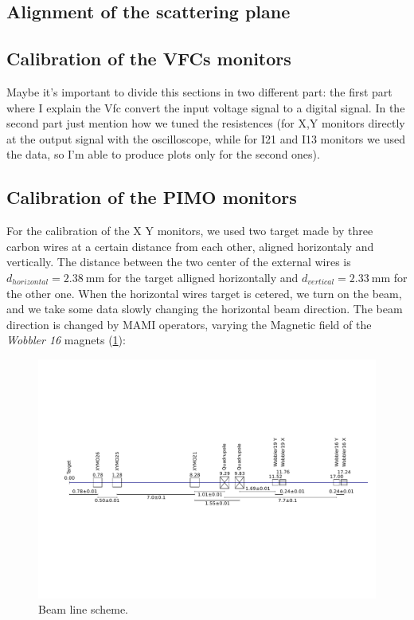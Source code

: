 \subsection{Alignment of the scattering plane}

\subsection{Calibration of the VFCs monitors}
Maybe it's important to divide this sections in two different part: the first part where I explain the Vfc convert the input voltage signal to a digital signal. In the second part just mention how we tuned the resistences (for X,Y monitors directly at the output signal with the oscilloscope, while for I21 and I13 monitors we used the data, so I'm able to produce plots only for the second ones).

\subsection{Calibration of the PIMO monitors}

For the calibration of the X Y monitors, we used two target made by three carbon wires at a certain distance from each other, aligned horizontaly and vertically. The distance between the two center of the external wires is $ d_{horizontal} = \SI{2.38}{\milli \meter}$ for the target alligned horizontally and $d_{vertical} = \SI{2.33}{\milli \meter}$ for the other one.
When the horizontal wires target is cetered, we turn on the beam, and we take some data slowly changing the horizontal beam direction. The beam direction is changed by MAMI operators, varying the Magnetic field of the \textit{Wobbler 16} magnets (\ref{fig:BeamLine}):

\begin{figure}[hbtp]
\centering
\includegraphics[scale=0.4]{figures/XYMOCalibBeamLine.svg.pdf}
\caption{Beam line scheme.}
\label{fig:BeamLine}
\end{figure}


